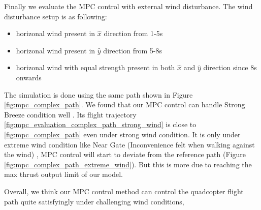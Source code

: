 \documentclass[12pt]{article}
\begin{document}
Finally we evaluate the MPC control with external wind disturbance.
The wind disturbance setup is as following:

\begin{itemize}
    \item horizonal wind present in $\hat{x}$ direction from 1-5s
    \item horizonal wind present in $\hat{y}$ direction from 5-8s
    \item horizonal wind with equal strength present in both $\hat{x}$ and $\hat{y}$ direction since 8s onwards
\end{itemize}

The simulation is done using the same  path shown in Figure \ref{fig:mpc_complex_path}.
We found that our MPC control can handle Strong Breeze condition well \cite{us_department_of_commerce_estimating_nodate}.
Its flight trajectory \ref{fig:mpc_evaluation_complex_path_strong_wind} is close to \ref{fig:mpc_complex_path} even under strong wind condition.
It is only under extreme wind condition like Near Gate (Inconvenience felt when walking against the wind) \cite{us_department_of_commerce_estimating_nodate},
MPC control will start to deviate from the reference path (Figure \ref{fig:mpc_complex_path_extreme_wind}). But this is more due to reaching the max thrust output limit of our model.

Overall, we think our MPC control method can control the quadcopter flight path quite satisfyingly under challenging wind conditions,
\end{document}
